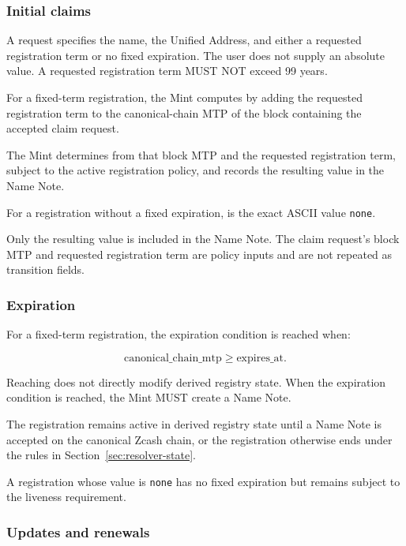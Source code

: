 \subsubsection{Initial claims}

A  request specifies the name, the Unified Address, and either a requested registration term or no fixed expiration. The user does not supply an absolute  value. A requested registration term MUST NOT exceed 99 years.

For a fixed-term registration, the Mint computes  by adding the requested registration term to the canonical-chain MTP of the block containing the accepted claim request.

The Mint determines  from that block MTP and the requested registration term, subject to the active registration policy, and records the resulting value in the Name Note.

For a registration without a fixed expiration,  is the exact ASCII value \texttt{none}.

Only the resulting  value is included in the Name Note. The claim request's block MTP and requested registration term are policy inputs and are not repeated as transition fields.

\subsubsection{Expiration}

For a fixed-term registration, the expiration condition is reached when:

$$\text{canonical\_chain\_mtp} \geq \text{expires\_at}.$$

Reaching  does not directly modify derived registry state. When the expiration condition is reached, the Mint MUST create a  Name Note.

The registration remains active in derived registry state until a  Name Note is accepted on the canonical Zcash chain, or the registration otherwise ends under the rules in Section~\ref{sec:resolver-state}.

A registration whose  value is \texttt{none} has no fixed expiration but remains subject to the liveness requirement.

\subsubsection{Updates and renewals}

